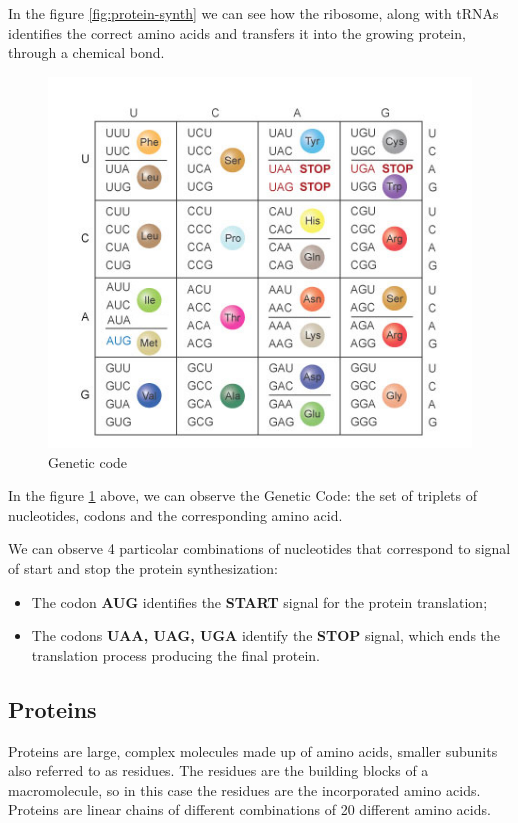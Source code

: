 In the figure \ref{fig:protein-synth} we can see how the ribosome, along with tRNAs identifies the correct amino acids and transfers it into the growing protein, through a chemical bond.

\begin{figure}[h!]
	\includegraphics[scale=1.4]{res/proteins_overview/genetic_code.png}
	\centering
	\caption{Genetic code}
	\label{fig:genetic-code}
\end{figure}

In the figure \ref{fig:genetic-code} above, we can observe the Genetic Code: the set of triplets of nucleotides, codons and the corresponding amino acid.

We can observe 4 particolar combinations of nucleotides that correspond to signal of start and stop the protein synthesization:
\begin{itemize}
	\item The codon \textbf{AUG} identifies the \textbf{START} signal for the protein translation;
	\item The codons \textbf{UAA, UAG, UGA} identify the \textbf{STOP} signal, which ends the translation process producing the final protein.
\end{itemize}
\vspace{5em}
\subsection{Proteins}
Proteins are large, complex molecules made up of amino acids, smaller subunits also referred to as residues. The residues are the building blocks of a macromolecule, so in this case the residues are the incorporated amino acids.
Proteins are linear chains of different combinations of 20 different amino acids. 

